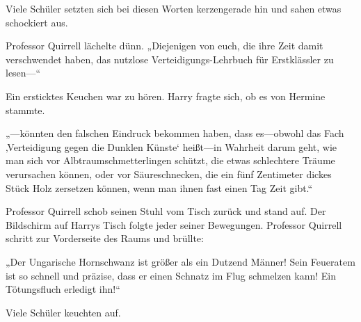 Viele Schüler setzten sich bei diesen Worten kerzengerade hin und sahen etwas schockiert aus.

Professor Quirrell lächelte dünn. „Diejenigen von euch, die ihre Zeit damit verschwendet haben, das nutzlose Verteidigungs-Lehrbuch für Erstklässler zu lesen—“

Ein ersticktes Keuchen war zu hören. Harry fragte sich, ob es von Hermine stammte.

„—könnten den falschen Eindruck bekommen haben, dass es—obwohl das Fach ‚Verteidigung gegen die Dunklen Künste‘ heißt—in Wahrheit darum geht, wie man sich vor Albtraumschmetterlingen schützt, die etwas schlechtere Träume verursachen können, oder vor Säureschnecken, die ein fünf Zentimeter dickes Stück Holz zersetzen können, wenn man ihnen fast einen Tag Zeit gibt.“

Professor Quirrell schob seinen Stuhl vom Tisch zurück und stand auf. Der Bildschirm auf Harrys Tisch folgte jeder seiner Bewegungen. Professor Quirrell schritt zur Vorderseite des Raums und brüllte:

„Der Ungarische Hornschwanz ist größer als ein Dutzend Männer! Sein Feueratem ist so schnell und präzise, dass er einen Schnatz im Flug schmelzen kann! Ein Tötungsfluch erledigt ihn!“

Viele Schüler keuchten auf.

